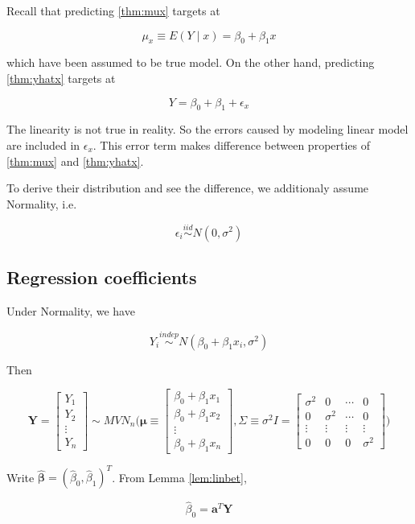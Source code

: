 \documentclass[]{book}
\theoremstyle{definition}
\theoremstyle{definition}
\theoremstyle{definition}
\theoremstyle{remark}
\begin{document}
Recall that predicting \ref{thm:mux} targets at

\[\mu_x \equiv E(Y \mid x) = \beta_0 + \beta_1 x\]

which have been assumed to be true model. On the other hand, predicting \ref{thm:yhatx} targets at

\[Y = \beta_0 + \beta_1 + \epsilon_x\]

The linearity is not true in reality. So the errors caused by modeling linear model are included in \(\epsilon_x\). This error term makes difference between properties of \ref{thm:mux} and \ref{thm:yhatx}.

To derive their distribution and see the difference, we additionaly assume Normality, i.e.

\[\epsilon_i \stackrel{iid}{\sim} N(0, \sigma^2)\]

\hypertarget{simplebdist}{%
\subsection{Regression coefficients}\label{simplebdist}}

Under Normality, we have

\[Y_i \stackrel{indep}{\sim} N(\beta_0 + \beta_1 x_i, \sigma^2)\]

Then

\[
\mathbf{Y} = \begin{bmatrix}
  Y_1 \\
  Y_2 \\
  \vdots \\
  Y_n
\end{bmatrix} \sim MVN_n\Bigg( \boldsymbol\mu \equiv \begin{bmatrix}
  \beta_0 + \beta_1 x_1 \\
  \beta_0 + \beta_1 x_2 \\
  \vdots \\
  \beta_0 + \beta_1 x_n
\end{bmatrix}, \Sigma \equiv \sigma^2 I = \begin{bmatrix}
  \sigma^2 & 0 & \cdots & 0 \\
  0 & \sigma^2 & \cdots & 0 \\
  \vdots & \vdots & \vdots & \vdots \\
  0 & 0 & 0 & \sigma^2
\end{bmatrix} \Bigg)
\]

Write \(\boldsymbol{\hat\beta} = (\hat\beta_0, \hat\beta_1)^T\). From Lemma \ref{lem:linbet},

\[\hat\beta_0 = \mathbf{a}^T\mathbf{Y}\]
\end{document}
